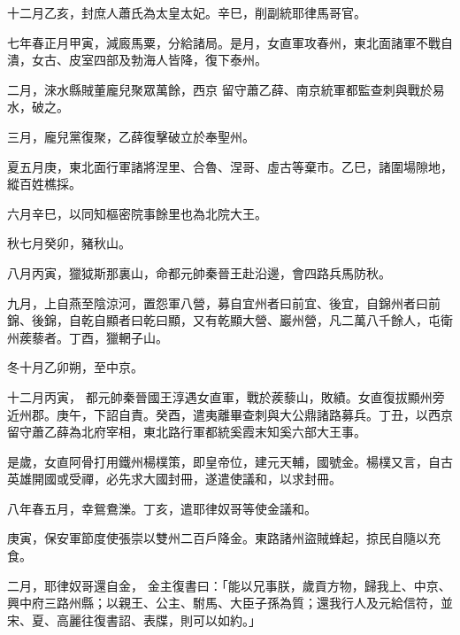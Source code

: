 \begin{pinyinscope}
 十二月乙亥，封庶人蕭氏為太皇太妃。辛巳，削副統耶律馬哥官。



 七年春正月甲寅，減廄馬粟，分給諸局。是月，女直軍攻春州，東北面諸軍不戰自潰，女古、皮室四部及勃海人皆降，復下泰州。



 二月，淶水縣賊董龐兒聚眾萬餘，西京
 留守蕭乙薛、南京統軍都監查刺與戰於易水，破之。



 三月，龐兒黨復聚，乙薛復擊破立於奉聖州。



 夏五月庚，東北面行軍諸將涅里、合魯、涅哥、虛古等棄市。乙巳，諸圍場隙地，縱百姓樵採。



 六月辛巳，以同知樞密院事餘里也為北院大王。



 秋七月癸卯，豬秋山。



 八月丙寅，獵狘斯那裏山，命都元帥秦晉王赴沿邊，會四路兵馬防秋。



 九月，上自燕至陰涼河，置怨軍八營，募自宜州者曰前宜、後宜，自錦州者曰前錦、後錦，自乾自顯者曰乾曰顯，又有乾顯大營、巖州營，凡二萬八千餘人，屯衛州蒺藜者。丁酉，獵輞子山。



 冬十月乙卯朔，至中京。



 十二月丙寅，
 都元帥秦晉國王淳遇女直軍，戰於蒺藜山，敗績。女直復拔顯州旁近州郡。庚午，下詔自責。癸酉，遣夷離畢查刺與大公鼎諸路募兵。丁丑，以西京留守蕭乙薛為北府宰相，東北路行軍都統奚霞末知奚六部大王事。



 是歲，女直阿骨打用鐵州楊樸策，即皇帝位，建元天輔，國號金。楊樸又言，自古英雄開國或受禪，必先求大國封冊，遂遣使議和，以求封冊。



 八年春五月，幸鴛鴦濼。丁亥，遣耶律奴哥等使金議和。



 庚寅，保安軍節度使張崇以雙州二百戶降金。東路諸州盜賊蜂起，掠民自隨以充食。



 二月，耶律奴哥還自金，
 金主復書曰：「能以兄事朕，歲貢方物，歸我上、中京、興中府三路州縣；以親王、公主、駙馬、大臣子孫為質；還我行人及元給信符，並宋、夏、高麗往復書詔、表牒，則可以如約。」




\end{pinyinscope}
